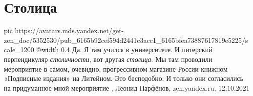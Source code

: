  
 
 
 
 
\chapter{Столица}
\label{sec:slova.stolica}

\ifcmt
  pic https://avatars.mds.yandex.net/get-zen_doc/5352530/pub_6165b92cef594d2441c3acc1_6165bfea73887617819e5225/scale_1200
  @width 0.4
\fi
Да. Я там учился в университете. И питерский перпендикуляр \emph{столичности}, вот
другая \emph{столица}. Мы там проводили мероприятие в самом, очевидно, прогрессивном
магазине России книжном «Подписные издания» на Литейном. Это бесподобно. И
только они согласились на придуманное мной мероприятие
, Леонид Парфёнов, zen.yandex.ru, 12.10.2021
